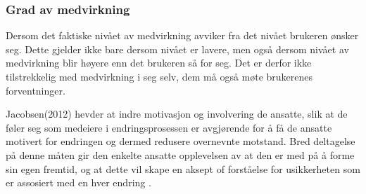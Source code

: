 \subsubsection{Grad av medvirkning}
Dersom det faktiske nivået av medvirkning avviker fra det nivået brukeren ønsker seg. Dette gjelder ikke bare dersom nivået er lavere, men også dersom nivået av medvirkning blir høyere enn det brukeren så for seg. Det er derfor ikke tilstrekkelig med medvirkning i seg selv, dem må også møte brukerenes forventninger. \cite{Cavaye95}

\noindent
Jacobsen(2012) hevder at indre motivasjon og involvering de ansatte, slik at de føler seg som medeiere i endringsprosessen er avgjørende for å få de ansatte motivert for endringen og dermed redusere overnevnte motstand. Bred deltagelse på denne måten gir den enkelte ansatte opplevelsen av at den er med på å forme sin egen fremtid, og at dette vil skape en aksept of forståelse for usikkerheten som er assosiert med en hver endring \cite{Jacobsen12}.